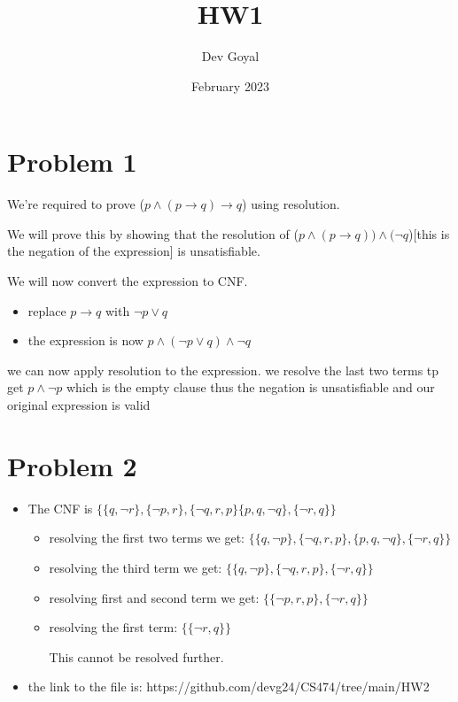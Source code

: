 \documentclass{article}
\title{HW1}
\author{Dev Goyal }
\date{February 2023}
\begin{document}
\maketitle

\section{Problem 1}

We're required to prove ($p \land (p \rightarrow q) \rightarrow q$) using resolution.

We will prove this by showing that the resolution of ($p \land (p \rightarrow q)) \land (\neg q$)[this is the negation of the expression] is unsatisfiable.

We will now convert the expression to CNF.

\begin{itemize}
    \item replace $p \rightarrow q $ with $\neg p \lor q$
    \item the expression is now $p \land (\neg p \lor q) \land \neg q$
\end{itemize}
we can now apply resolution to the expression. we resolve the last two terms tp get $p \land \neg p$ which is the empty clause thus the negation is unsatisfiable and our original expression is valid 

\section{Problem 2}
\begin{itemize}
    \item The CNF is $\{ \{ q, \neg r\}, \{ \neg p, r \},\{ \neg q, r, p\} \{p, q, \neg q \}, \{\neg r, q \}\}$
    \begin{itemize}
        \item resolving the first two terms we get: $\{ \{ q, \neg p\},\{ \neg q, r, p\}, \{p, q, \neg q \}, \{\neg r, q \} \} $
        \item resolving the third term we get: $\{ \{ q, \neg p\},\{ \neg q, r, p\}, \{\neg r, q \} \} $
        \item resolving first and second term we get: $\{ \{ \neg p, r, p\}, \{\neg r, q \} \} $
        \item resolving the first term: $\{ \{\neg r, q \} \} $
        
        This cannot be resolved further.
        
    \end{itemize}
    
    \item the link to the file is: https://github.com/devg24/CS474/tree/main/HW2
\end{itemize}
\end{document}
